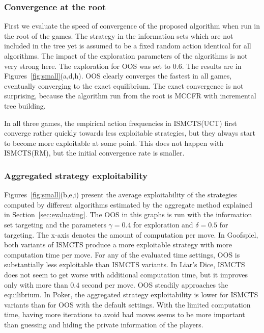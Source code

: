 \documentclass{aamas2015}
\newcounter{vlNoteCounter}
\newcommand{\vlnote}[1]{{\scriptsize \color{blue} $\blacksquare$ \refstepcounter{vlNoteCounter}\textsf{[VL]$_{\arabic{vlNoteCounter}}$:{#1}}}}
\renewcommand{\vlnote}[1]{}
\begin{document}

\subsubsection{Convergence at the root}

First we evaluate the speed of convergence of the proposed algorithm when run in the root of the games. The strategy in the information sets which are not included in the tree yet is assumed to be a fixed random action identical for all algorithms. The impact of the exploration parameters of the algorithms is not very strong here. The exploration for OOS was set to $0.6$. The results are in Figures~\ref{fig:small}(a,d,h). OOS clearly converges the fastest in all games, eventually converging to the exact equilibrium. The exact convergence is not surprising, because the algorithm run from the root is MCCFR with incremental tree building.

In all three games, the empirical action frequencies in ISMCTS(UCT) first converge rather quickly towards less exploitable strategies, but they always start to become more exploitable at some point. This does not happen with ISMCTS(RM), but the initial convergence rate is smaller.

\subsubsection{Aggregated strategy exploitability}

Figures~\ref{fig:small}(b,e,i) present the average exploitability of the strategies computed by different algorithms estimated by the aggregate method explained in Section~\ref{sec:evaluating}. The OOS in this graphs is run with the information set targeting and the parameters $\gamma=0.4$ for exploration and $\delta=0.5$ for targeting.
The x-axis denotes the amount of computation per move. In Goofspiel, both variants of ISMCTS produce a more exploitable strategy with more computation time per move. For any of the evaluated time settings, OOS is substantially less exploitable than ISMCTS variants. In Liar's Dice, ISMCTS does not seem to get worse with additional computation time, but it improves only with more than $0.4$ second per move. OOS steadily approaches the equilibrium. In Poker, the aggregated strategy exploitability is lower for ISMCTS variants than for  OOS with the default settings. With the limited computation time, having more iterations to avoid bad moves seems to be more important than guessing and hiding the private information of the players.\vlnote{explain above that this is what the correct algorithms does and ISMCTS ignores}
\end{document}
